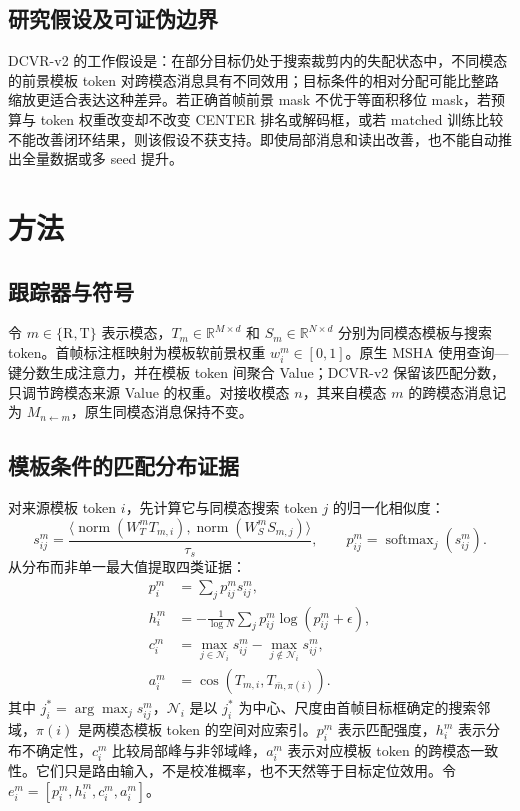 \documentclass[journal]{IEEEtran}
\newcommand{\R}{\mathrm{R}}
\newcommand{\T}{\mathrm{T}}
\newcommand{\softmax}{\operatorname{softmax}}
\begin{document}
\subsection{研究假设及可证伪边界}
DCVR-v2 的工作假设是：在部分目标仍处于搜索裁剪内的失配状态中，不同模态的前景模板 token 对跨模态消息具有不同效用；目标条件的相对分配可能比整路缩放更适合表达这种差异。若正确首帧前景 mask 不优于等面积移位 mask，若预算与 token 权重改变却不改变 CENTER 排名或解码框，或若 matched 训练比较不能改善闭环结果，则该假设不获支持。即使局部消息和读出改善，也不能自动推出全量数据或多 seed 提升。

\section{方法}
\subsection{跟踪器与符号}
令 $m\in\{\R,\T\}$ 表示模态，$T_m\in\mathbb{R}^{M\times d}$ 和 $S_m\in\mathbb{R}^{N\times d}$ 分别为同模态模板与搜索 token。首帧标注框映射为模板软前景权重 $w_i^m\in[0,1]$。原生 MSHA 使用查询—键分数生成注意力，并在模板 token 间聚合 Value；DCVR-v2 保留该匹配分数，只调节跨模态来源 Value 的权重。对接收模态 $n$，其来自模态 $m$ 的跨模态消息记为 $M_{n\leftarrow m}$，原生同模态消息保持不变。

\subsection{模板条件的匹配分布证据}
对来源模板 token $i$，先计算它与同模态搜索 token $j$ 的归一化相似度：
\begin{equation}
 s_{ij}^{m}=\frac{\langle \operatorname{norm}(W_T^mT_{m,i}),
                   \operatorname{norm}(W_S^mS_{m,j})\rangle}{\tau_s},
 \qquad p_{ij}^{m}=\softmax_j(s_{ij}^{m}).
\end{equation}
从分布而非单一最大值提取四类证据：
\begin{align}
 p_i^m &= \sum_j p_{ij}^m s_{ij}^m, \\
 h_i^m &= -\frac{1}{\log N}\sum_j p_{ij}^m\log(p_{ij}^m+\epsilon), \\
 c_i^m &= \max_{j\in\mathcal{N}_i}s_{ij}^m-\max_{j\notin\mathcal{N}_i}s_{ij}^m, \\
 a_i^m &= \operatorname{cos}(T_{m,i},T_{\bar m,\pi(i)}).
\end{align}
其中 $j_i^*=\arg\max_j s_{ij}^m$，$\mathcal{N}_i$ 是以 $j_i^*$ 为中心、尺度由首帧目标框确定的搜索邻域，$\pi(i)$ 是两模态模板 token 的空间对应索引。$p_i^m$ 表示匹配强度，$h_i^m$ 表示分布不确定性，$c_i^m$ 比较局部峰与非邻域峰，$a_i^m$ 表示对应模板 token 的跨模态一致性。它们只是路由输入，不是校准概率，也不天然等于目标定位效用。令 $e_i^m=[p_i^m,h_i^m,c_i^m,a_i^m]$。
\end{document}
